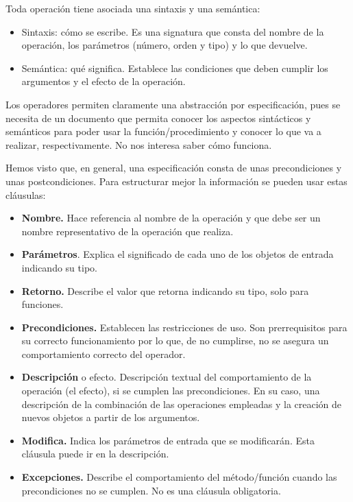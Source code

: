 Toda operación tiene asociada una sintaxis y una semántica:
\begin{itemize}
\item Sintaxis: cómo se escribe. Es una signatura  que consta del nombre de la operación, los parámetros (número, orden y tipo) y lo que devuelve. 
\item Semántica: qué significa. Establece las condiciones que deben cumplir los argumentos y el efecto de la operación.
\end{itemize}

Los operadores permiten claramente una abstracción por especificación, pues se necesita de un documento que permita conocer los aspectos sintácticos y semánticos para poder usar la función/procedimiento y conocer lo que va a realizar, respectivamente. No nos interesa saber cómo funciona. 



 

Hemos visto que, en general, una especificación consta de unas precondiciones y unas postcondiciones. Para estructurar mejor la información se pueden usar estas cláusulas:
\begin{itemize}
\item \textbf{Nombre.} Hace referencia al nombre de la operación y que debe ser un nombre representativo de la operación que realiza.
\item \textbf{Parámetros}. Explica el significado de cada uno de los objetos de entrada indicando su tipo.
\item \textbf{Retorno.} Describe el valor que retorna indicando su tipo, solo para funciones.
\item \textbf{Precondiciones.} Establecen las restricciones de uso. Son prerrequisitos para su correcto funcionamiento por lo que, de no cumplirse, no se asegura un comportamiento correcto del operador.
\item \textbf{Descripción} o efecto. Descripción textual del comportamiento de la operación (el efecto), si se cumplen las precondiciones. En su caso, una descripción de la combinación de las operaciones empleadas y la creación de nuevos objetos a partir de los argumentos.
\item \textbf{Modifica.}  Indica los parámetros de entrada que se modificarán. Esta cláusula puede ir en la descripción.
\item \textbf{Excepciones.} Describe el comportamiento del método/función cuando las precondiciones no se cumplen. No es una cláusula obligatoria.
\end{itemize}

